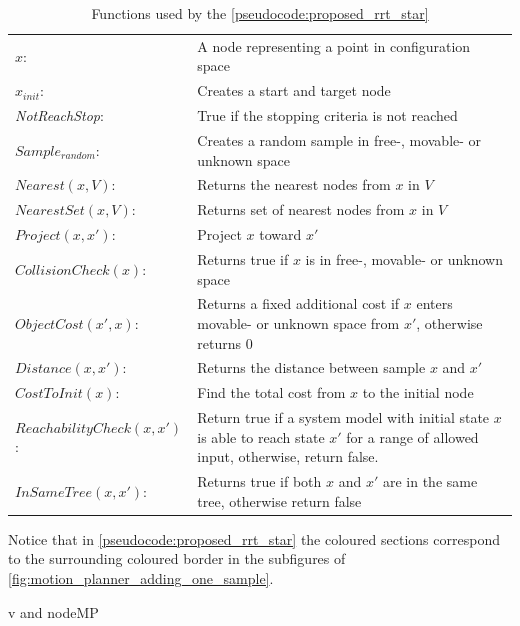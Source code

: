 \begin{table}[H]
\centering
\begin{tabular}[t]{l p{10cm}}
$x$:& A node representing a point in configuration space\\
$x_{init}$:& Creates a start and target node\\ 
\textit{NotReachStop}:& True if the stopping criteria is not reached\\ 
$\mathit{Sample_{random}}$:& Creates a random sample in free-, movable- or unknown space\\
$\mathit{Nearest}(x, V)$:& Returns the nearest nodes from $x$ in $V$\\
$\mathit{NearestSet}(x, V)$:& Returns set of nearest nodes from $x$ in $V$\\
$\mathit{Project}(x, x')$:& Project $x$ toward $x'$\\
$\mathit{CollisionCheck}(x)$:& Returns true if $x$ is in free-, movable- or unknown space\\
$\mathit{ObjectCost}(x', x)$:& Returns a fixed additional cost if $x$ enters movable- or unknown space from $x'$, otherwise returns 0\\
$\mathit{Distance}(x, x')$:& Returns the distance between sample $x$ and $x'$\\
$\mathit{CostToInit}(x)$:& Find the total cost from $x$ to the initial node\\
  $\mathit{ReachabilityCheck}(x, x')$:& Return true if a system model with initial state $x$ is able to reach state $x'$ for a range of allowed input, otherwise, return false.\\
  $\mathit{InSameTree}(x, x')$:& Returns true if both $x$ and $x'$ are in the same tree, otherwise return false\\
\end{tabular}
\caption{Functions used by the \cref{pseudocode:proposed_rrt_star}}
\label{table:functions_for_proposed_rrt_star}
\end{table}

Notice that in \cref{pseudocode:proposed_rrt_star} the coloured sections correspond to the surrounding coloured border in the subfigures of \cref{fig:motion_planner_adding_one_sample}.\bs


v and \gls{nodeMP}

